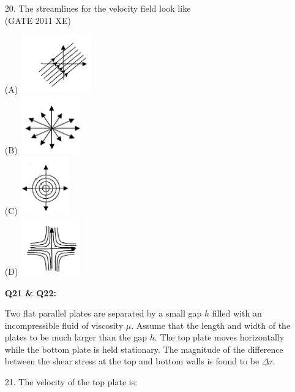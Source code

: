 \documentclass[journal,12pt,onecolumn]{IEEEtran}
\begin{document}
\begin{enumerate}
\begin{enumerate}
\begin{enumerate}
\item[20.] The streamlines for the velocity field look like\\

\hfill{(GATE 2011 XE)} \\
\begin{multicols}{4}
(A) \includegraphics[height=2.5cm]{figs/B/fig20a.png} \\
(B) \includegraphics[height=2.5cm]{figs/B/fig20b.png} \\
(C) \includegraphics[height=2.5cm]{figs/B/fig20c.png} \\
(D) \includegraphics[height=2.5cm]{figs/B/fig20d.png} \\
\end{multicols}

\item[\textbf{Q21 \& Q22:}]

Two flat parallel plates are separated by a small gap $h$ filled with an incompressible fluid of viscosity $\mu$. Assume that the length and width of the plates to be much larger than the gap $h$. The top plate moves horizontally while the bottom plate is held stationary. The magnitude of the difference between the shear stress at the top and bottom walls is found to be $\Delta \tau$.\\


\item[21.] The velocity of the top plate is:\\


\end{enumerate}
\end{enumerate}
\end{enumerate}
\end{document}
